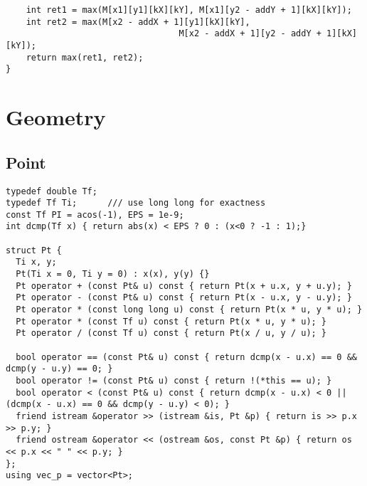 \documentclass[FSZ,a4paper,onesided]{article}
\begin{document}
\begin{multicols*}{\COLS}
\begin{lstlisting}
    int ret1 = max(M[x1][y1][kX][kY], M[x1][y2 - addY + 1][kX][kY]);
    int ret2 = max(M[x2 - addX + 1][y1][kX][kY],
                                  M[x2 - addX + 1][y2 - addY + 1][kX][kY]);
    return max(ret1, ret2);
}
\end{lstlisting}
\section{Geometry}
\subsection{Point}
\begin{lstlisting}
typedef double Tf;
typedef Tf Ti;      /// use long long for exactness
const Tf PI = acos(-1), EPS = 1e-9;
int dcmp(Tf x) { return abs(x) < EPS ? 0 : (x<0 ? -1 : 1);}

struct Pt {
  Ti x, y;
  Pt(Ti x = 0, Ti y = 0) : x(x), y(y) {}
  Pt operator + (const Pt& u) const { return Pt(x + u.x, y + u.y); }
  Pt operator - (const Pt& u) const { return Pt(x - u.x, y - u.y); }
  Pt operator * (const long long u) const { return Pt(x * u, y * u); }
  Pt operator * (const Tf u) const { return Pt(x * u, y * u); }
  Pt operator / (const Tf u) const { return Pt(x / u, y / u); }

  bool operator == (const Pt& u) const { return dcmp(x - u.x) == 0 && dcmp(y - u.y) == 0; }
  bool operator != (const Pt& u) const { return !(*this == u); }
  bool operator < (const Pt& u) const { return dcmp(x - u.x) < 0 || (dcmp(x - u.x) == 0 && dcmp(y - u.y) < 0); }
  friend istream &operator >> (istream &is, Pt &p) { return is >> p.x >> p.y; }
  friend ostream &operator << (ostream &os, const Pt &p) { return os << p.x << " " << p.y; }
};
using vec_p = vector<Pt>;


\end{lstlisting}
\end{multicols*}
\end{document}
